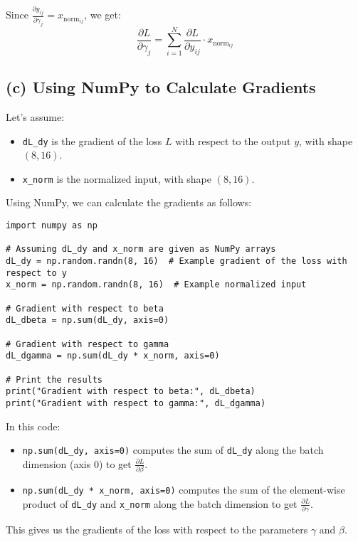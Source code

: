 \documentclass{article}
\begin{document}
Since $\frac{\partial y_{ij}}{\partial \gamma_j} = x_{\text{norm}_{ij}}$, we get:
\[
\frac{\partial L}{\partial \gamma_j} = \sum_{i=1}^{N} \frac{\partial L}{\partial y_{ij}} \cdot x_{\text{norm}_{ij}}
\]

\subsection*{(c) Using NumPy to Calculate Gradients}

Let's assume:
\begin{itemize}
    \item \texttt{dL\_dy} is the gradient of the loss $L$ with respect to the output $y$, with shape $(8, 16)$.
    \item \texttt{x\_norm} is the normalized input, with shape $(8, 16)$.
\end{itemize}

Using NumPy, we can calculate the gradients as follows:

\begin{verbatim}
import numpy as np

# Assuming dL_dy and x_norm are given as NumPy arrays
dL_dy = np.random.randn(8, 16)  # Example gradient of the loss with respect to y
x_norm = np.random.randn(8, 16)  # Example normalized input

# Gradient with respect to beta
dL_dbeta = np.sum(dL_dy, axis=0)

# Gradient with respect to gamma
dL_dgamma = np.sum(dL_dy * x_norm, axis=0)

# Print the results
print("Gradient with respect to beta:", dL_dbeta)
print("Gradient with respect to gamma:", dL_dgamma)
\end{verbatim}

In this code:
\begin{itemize}
    \item \texttt{np.sum(dL\_dy, axis=0)} computes the sum of \texttt{dL\_dy} along the batch dimension (axis 0) to get $\frac{\partial L}{\partial \beta}$.
    \item \texttt{np.sum(dL\_dy * x\_norm, axis=0)} computes the sum of the element-wise product of \texttt{dL\_dy} and \texttt{x\_norm} along the batch dimension to get $\frac{\partial L}{\partial \gamma}$.
\end{itemize}

This gives us the gradients of the loss with respect to the parameters $\gamma$ and $\beta$.
\end{document}
